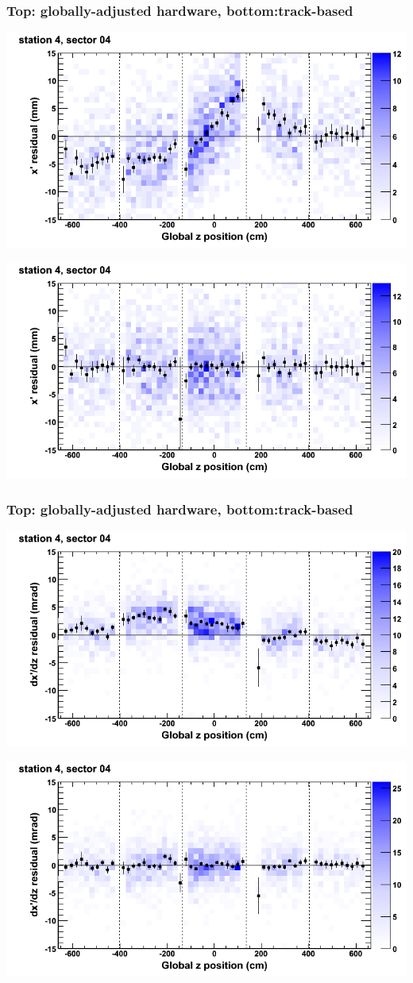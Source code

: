 \documentclass[compress]{beamer}
\begin{document}
\begin{frame}
\frametitle{Top: globally-adjusted hardware, bottom:track-based}
\includegraphics[width=0.7\linewidth]{NOV4_mapplots_HW/DTvsz_st4sec04_x.png}

\includegraphics[width=0.7\linewidth]{NOV4_mapplots/DTvsz_st4sec04_x.png}
\end{frame}

\begin{frame}
\frametitle{Top: globally-adjusted hardware, bottom:track-based}
\includegraphics[width=0.7\linewidth]{NOV4_mapplots_HW/DTvsz_st4sec04_dxdz.png}

\includegraphics[width=0.7\linewidth]{NOV4_mapplots/DTvsz_st4sec04_dxdz.png}
\end{frame}
\end{document}
